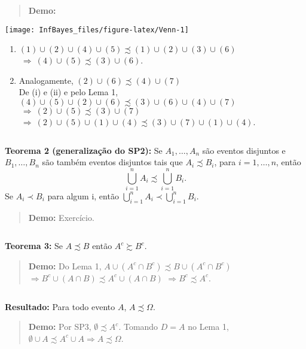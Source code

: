 \documentclass[
]{book}
\providecommand{\tightlist}{%
  \setlength{\itemsep}{0pt}\setlength{\parskip}{0pt}}
\begin{document}
\begin{quote}
\textbf{Demo:}
\end{quote}

\begin{center}\texttt{[image: InfBayes\_files/figure-latex/Venn-1]} \end{center}

\begin{enumerate}
\def\labelenumi{(\roman{enumi})}
\tightlist
\item
  \((1) \cup (2) \cup (4) \cup (5) \precsim (1) \cup (2) \cup (3) \cup (6)\) \(~\Rightarrow~ (4) \cup (5) \precsim (3) \cup (6)\).\\
\item
  Analogamente, \((2) \cup (6) \precsim (4) \cup (7)\)\\
  De (i) e (ii) e pelo Lema 1, \((4) \cup (5) \cup (2) \cup (6) \precsim (3) \cup (6) \cup (4) \cup (7)\)\\
  \(~\Rightarrow~ (2) \cup (5) \precsim (3) \cup (7)\) \({~\Rightarrow~ (2) \cup (5) \cup (1) \cup(4) \precsim (3) \cup (7) \cup (1) \cup(4)}\).
\end{enumerate}

\(~\)

\textbf{Teorema 2 (generalização do SP2):}
Se \(A_1, \ldots, A_n\) são eventos disjuntos e \(B_1, \ldots, B_n\) são também eventos disjuntos tais que \(A_i \precsim B_i\), para \(i=1,\ldots,n\), então \[\bigcup_{i=1}^{n} A_i \precsim \bigcup_{i=1}^{n} B_i.\]
Se \(A_i \prec B_i\) para algum i, então \(\bigcup_{i=1}^{n} A_i \prec \bigcup_{i=1}^{n} B_i.\)

\begin{quote}
\textbf{Demo:} Exercício.
\end{quote}

\(~\)

\textbf{Teorema 3:}
Se \(A \precsim B\) então \(A^c \succsim B^c\).

\begin{quote}
\textbf{Demo:} Do Lema 1, \(A \cup (A^c \cap B^c) \precsim B \cup (A^c \cap B^c)\) \(\Rightarrow B^c \cup (A \cap B) \precsim A^c \cup (A \cap B)\) \(\Rightarrow B^c \precsim A^c\).
\end{quote}

\(~\)

\textbf{Resultado:} Para todo evento \(A\), \(A \precsim \Omega\).

\begin{quote}
\textbf{Demo:} Por SP3, \(\emptyset \precsim A^c\). Tomando \(D=A\) no Lema 1, \(\emptyset \cup A \precsim A^c \cup A \Rightarrow A \precsim \Omega\).
\end{quote}
\end{document}
